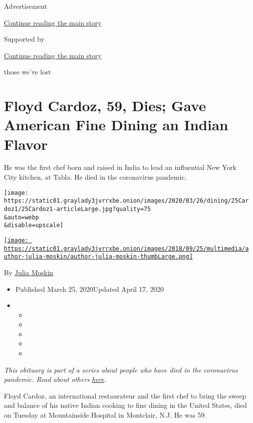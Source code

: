 Advertisement

\protect\hyperlink{after-top}{Continue reading the main story}

Supported by

\protect\hyperlink{after-sponsor}{Continue reading the main story}

those we've lost

\hypertarget{floyd-cardoz-59-dies-gave-american-fine-dining-an-indian-flavor}{%
\section{Floyd Cardoz, 59, Dies; Gave American Fine Dining an Indian
Flavor}\label{floyd-cardoz-59-dies-gave-american-fine-dining-an-indian-flavor}}

He was the first chef born and raised in India to lead an influential
New York City kitchen, at Tabla. He died in the coronavirus pandemic.

\texttt{[image: https://static01.graylady3jvrrxbe.onion/images/2020/03/26/dining/25Cardoz1/25Cardoz1-articleLarge.jpg?quality=75\\\&auto=webp\\\&disable=upscale]}

\href{https://www.nytimes3xbfgragh.onion/by/julia-moskin}{\texttt{[image: https://static01.graylady3jvrrxbe.onion/images/2018/09/25/multimedia/author-julia-moskin/author-julia-moskin-thumbLarge.png]}}

By \href{https://www.nytimes3xbfgragh.onion/by/julia-moskin}{Julia
Moskin}

\begin{itemize}
\item
  Published March 25, 2020Updated April 17, 2020
\item
  \begin{itemize}
  \item
  \item
  \item
  \item
  \item
  \end{itemize}
\end{itemize}

\emph{This obituary is part of a series about people who have died in
the coronavirus pandemic. Read about others}
\href{https://www.nytimes3xbfgragh.onion/series/people-who-have-died-of-the-coronavirus}{\emph{here}}\emph{.}

Floyd Cardoz, an international restaurateur and the first chef to bring
the sweep and balance of his native Indian cooking to fine dining in the
United States, died on Tuesday at Mountainside Hospital in Montclair,
N.J. He was 59.

